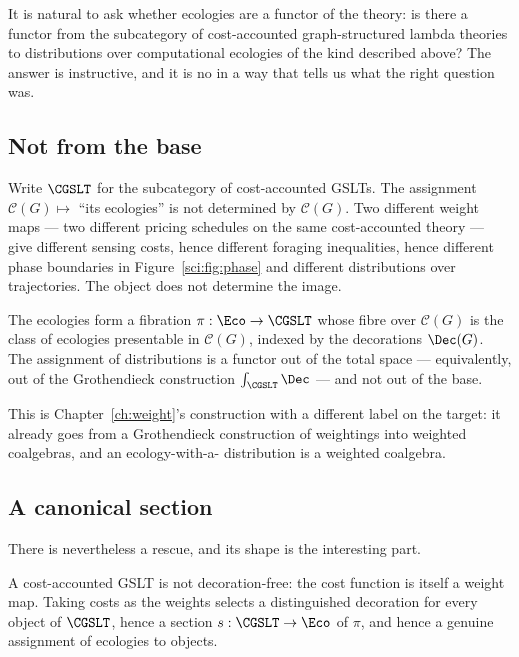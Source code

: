 It is natural to ask whether ecologies are a functor of the theory: is there a functor from the
subcategory of cost-accounted graph-structured lambda theories to distributions over computational
ecologies of the kind described above? The answer is instructive, and it is no in a way that tells us
what the right question was.

\subsection{Not from the base}\label{sci:S15.1}

Write $\CGSLT$ for the subcategory of cost-accounted GSLTs. The assignment
$\mathcal{C}(G) \mapsto$ ``its ecologies'' is not determined by $\mathcal{C}(G)$. Two different weight
maps --- two different pricing schedules on the same cost-accounted theory --- give different sensing
costs, hence different foraging inequalities, hence different phase boundaries in
Figure~\ref{sci:fig:phase} and different distributions over trajectories. The object does not determine
the image.

\begin{proposition}
\label{sci:prop:fibration}
The ecologies form a fibration $\pi : \Eco \to \CGSLT$ whose fibre over $\mathcal{C}(G)$ is the class
of ecologies presentable in $\mathcal{C}(G)$, indexed by the decorations $\Dec(G)$. The assignment of
distributions is a functor out of the total space --- equivalently, out of the Grothendieck
construction $\textstyle\int_{\CGSLT} \Dec$ --- and not out of the base.
\end{proposition}

This is Chapter~\ref{ch:weight}'s construction with a different label on the target: it already goes
from a Grothendieck construction of weightings into weighted coalgebras, and an ecology-with-a-
distribution is a weighted coalgebra.

\subsection{A canonical section}\label{sci:S15.2}

There is nevertheless a rescue, and its shape is the interesting part.

\begin{proposition}
\label{sci:prop:section}
A cost-accounted GSLT is not decoration-free: the cost function is itself a weight map. Taking costs
as the weights selects a distinguished decoration for every object of $\CGSLT$, hence a section
$s : \CGSLT \to \Eco$ of $\pi$, and hence a genuine assignment of ecologies to objects.
\end{proposition}

